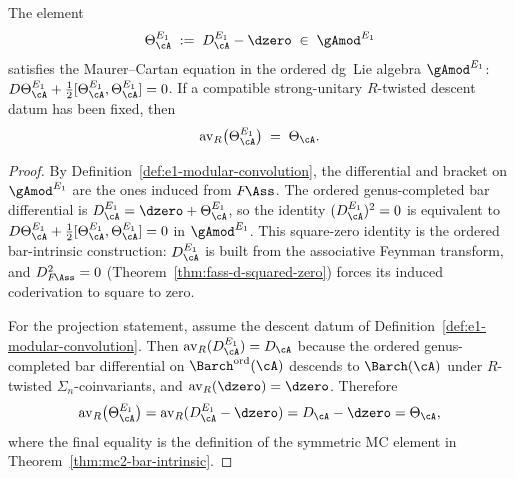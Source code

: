 \begin{theorem}
\label{thm:e1-mc-element}
The element
\begin{equation}
\label{eq:theta-e1}
\Theta_\cA^{E_1}
\;:=\;
D_\cA^{E_1} - \dzero
\;\in\;
{\gAmod}^{E_1}
\end{equation}
satisfies the Maurer--Cartan equation in the ordered dg~Lie algebra
${\gAmod}^{E_1}$:
$D\Theta_\cA^{E_1}
+ \tfrac{1}{2}[\Theta_\cA^{E_1}, \Theta_\cA^{E_1}] = 0$.
If a compatible strong-unitary $R$-twisted descent datum has been
fixed, then
\begin{equation}
\label{eq:e1-to-einfty-mc}
\operatorname{av}_R\bigl(\Theta_\cA^{E_1}\bigr)
\;=\;
\Theta_\cA.
\end{equation}
\end{theorem}

\begin{proof}
By Definition~\ref{def:e1-modular-convolution}, the differential and
bracket on ${\gAmod}^{E_1}$ are the ones induced from $F\!\Ass$.
The ordered genus-completed bar differential is
$D_\cA^{E_1} = \dzero + \Theta_\cA^{E_1}$, so the identity
$(D_\cA^{E_1})^2 = 0$ is equivalent to
$D\Theta_\cA^{E_1}
+ \tfrac{1}{2}[\Theta_\cA^{E_1}, \Theta_\cA^{E_1}] = 0$
in ${\gAmod}^{E_1}$. This square-zero identity is the ordered
bar-intrinsic construction: $D_\cA^{E_1}$ is built from the
associative Feynman transform, and $D_{F\!\Ass}^2 = 0$
\textup{(}Theorem~\textup{\ref{thm:fass-d-squared-zero}}\textup{)}
forces its induced coderivation to square to zero.

For the projection statement, assume the descent datum of
Definition~\ref{def:e1-modular-convolution}. Then
$\operatorname{av}_R(D_\cA^{E_1}) = D_\cA$ because the ordered
genus-completed bar differential on
${\Barch}^{\mathrm{ord}}(\cA)$ descends to $\Barch(\cA)$ under
$R$-twisted $\Sigma_n$-coinvariants, and
$\operatorname{av}_R(\dzero) = \dzero$.
Therefore
\[
\operatorname{av}_R\bigl(\Theta_\cA^{E_1}\bigr)
=
\operatorname{av}_R(D_\cA^{E_1} - \dzero)
=
D_\cA - \dzero
=
\Theta_\cA,
\]
where the final equality is the definition of the symmetric MC
element in Theorem~\ref{thm:mc2-bar-intrinsic}.
\end{proof}

